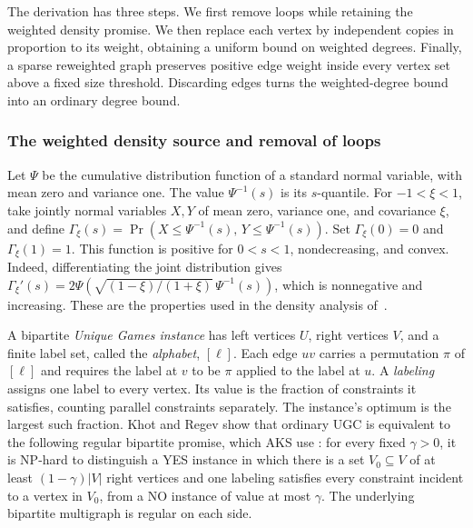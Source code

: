 The derivation has three steps. We first remove loops while retaining
the weighted density promise. We then replace each vertex by
independent copies in proportion to its weight, obtaining a
uniform bound on weighted degrees. Finally, a sparse reweighted
graph preserves positive edge weight inside every vertex set above
a fixed size threshold. Discarding edges turns the weighted-degree
bound into an ordinary degree bound.

\subsubsection{The weighted density source and removal of loops}

Let $\Psi$ be the cumulative distribution function of a standard
normal variable, with mean zero and variance one. The value $\Psi^{-1}(s)$
is its $s$-quantile. For $-1<\xi<1$, take jointly normal variables
$X,Y$ of mean zero, variance one, and covariance $\xi$, and define
$\Gamma_\xi(s)=\Pr(X\le\Psi^{-1}(s),\,Y\le\Psi^{-1}(s))$.
Set $\Gamma_\xi(0)=0$ and $\Gamma_\xi(1)=1$.
This function is positive for $0<s<1$, nondecreasing, and convex.
Indeed, differentiating the joint distribution gives
$\Gamma_\xi'(s)=2\Psi(\sqrt{(1-\xi)/(1+\xi)}\,\Psi^{-1}(s))$,
which is nonnegative and increasing. These are the properties used
in the density analysis of~\cite[Theorem~3.1 and equation~(3.2)]{AKS2011}.

A bipartite \emph{Unique Games instance} has left vertices $U$,
right vertices $V$, and a finite label set, called the
\emph{alphabet}, $[\ell]$. Each edge $uv$ carries a permutation
$\pi$ of $[\ell]$ and requires the label at $v$ to be $\pi$ applied
to the label at $u$. A \emph{labeling} assigns one label to every
vertex. Its value is the fraction of constraints it satisfies,
counting parallel constraints separately. The instance's optimum
is the largest such fraction.
Khot and Regev show that ordinary \textup{UGC} is equivalent to the
following regular bipartite promise, which AKS use
\cite[Conjecture~2.4]{AKS2011}: for every fixed $\gamma>0$, it is
\textup{NP}-hard to distinguish a YES instance in which there is a set
$V_0\subseteq V$ of at least $(1-\gamma)|V|$ right vertices and one
labeling satisfies every constraint incident to a vertex in $V_0$,
from a NO instance of value at most $\gamma$. The underlying
bipartite multigraph is regular on each side.

